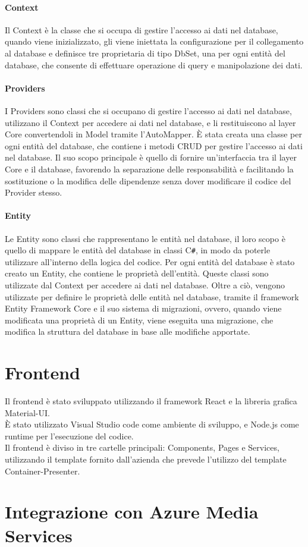 \paragraph{Context}
Il Context è la classe che si occupa di gestire l'accesso ai dati nel database, quando viene inizializzato, gli viene iniettata la configurazione per il collegamento al database e definisce tre proprietaria di tipo DbSet, una per ogni entità del database, che consente di effettuare operazione di query e manipolazione dei dati.\\

\paragraph{Providers}
I Providers sono classi che si occupano di gestire l'accesso ai dati nel database, utilizzano il Context per accedere ai dati nel database, e li restituiscono al layer Core convertendoli in Model tramite l'AutoMapper. È stata creata una classe per ogni entità del database, che contiene i metodi CRUD per gestire l'accesso ai dati nel database. Il suo scopo principale è quello di fornire un'interfaccia tra il layer Core e il database, favorendo la separazione delle responsabilità e facilitando la sostituzione o la modifica delle dipendenze senza dover modificare il codice del Provider stesso.\\

\paragraph{Entity}
Le Entity sono classi che rappresentano le entità nel database, il loro scopo è quello di mappare le entità del database in classi C\texttt{\#}, in modo da poterle utilizzare all'interno della logica del codice. Per ogni entità del database è stato creato un Entity, che contiene le proprietà dell'entità. Queste classi sono utilizzate dal Context per accedere ai dati nel database. Oltre a ciò, vengono utilizzate per definire le proprietà delle entità nel database, tramite il framework Entity Framework Core e il suo sistema di migrazioni, ovvero, quando viene modificata una proprietà di un Entity, viene eseguita una migrazione, che modifica la struttura del database in base alle modifiche apportate.\\

\section{Frontend}
Il frontend è stato sviluppato utilizzando il framework React e la libreria grafica Material-UI.\\
È stato utilizzato Visual Studio code come ambiente di sviluppo, e Node.js come runtime per l'esecuzione del codice.\\
Il frontend è diviso in tre cartelle principali: Components, Pages e Services, utilizzando il template fornito dall'azienda che prevede l'utilizzo del template Container-Presenter.\\

\section{Integrazione con Azure Media Services}